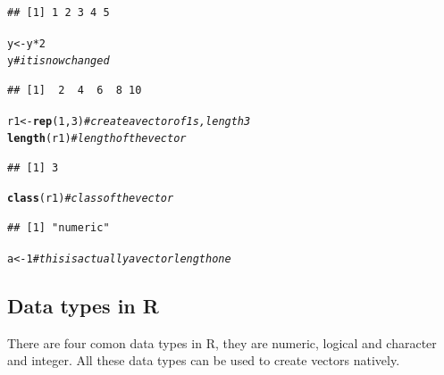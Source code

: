 \documentclass[english,nohyper]{tufte-book}\usepackage[]{graphicx}\usepackage[]{color}
\makeatletter
\newcommand{\hlnum}[1]{\textcolor[rgb]{0.686,0.059,0.569}{#1}}%
\newcommand{\hlcom}[1]{\textcolor[rgb]{0.678,0.584,0.686}{\textit{#1}}}%
\newcommand{\hlopt}[1]{\textcolor[rgb]{0,0,0}{#1}}%
\newcommand{\hlstd}[1]{\textcolor[rgb]{0.345,0.345,0.345}{#1}}%
\newcommand{\hlkwb}[1]{\textcolor[rgb]{0.69,0.353,0.396}{#1}}%
\newcommand{\hlkwd}[1]{\textcolor[rgb]{0.737,0.353,0.396}{\textbf{#1}}}%
\newenvironment{kframe}{%
 \def\at@end@of@kframe{}%
 \ifinner\ifhmode%
  \def\at@end@of@kframe{\end{minipage}}%
  \begin{minipage}{\columnwidth}%
 \fi\fi%
 \def\FrameCommand##1{\hskip\@totalleftmargin \hskip-\fboxsep
 \colorbox{shadecolor}{##1}\hskip-\fboxsep
     \hskip-\linewidth \hskip-\@totalleftmargin \hskip\columnwidth}%
 \MakeFramed {\advance\hsize-\width
   \@totalleftmargin\z@ \linewidth\hsize
   \@setminipage}}%
 {\par\unskip\endMakeFramed%
 \at@end@of@kframe}
\newenvironment{knitrout}{}{} %
\makeatother
\begin{document}
\begin{knitrout}
\begin{kframe}
\begin{verbatim}
## [1] 1 2 3 4 5
\end{verbatim}
\begin{alltt}
\hlstd{y} \hlkwb{<-} \hlstd{y} \hlopt{*} \hlnum{2}
\hlstd{y}  \hlcom{#it is now changed}
\end{alltt}
\begin{verbatim}
## [1]  2  4  6  8 10
\end{verbatim}
\begin{alltt}
\hlstd{r1} \hlkwb{<-} \hlkwd{rep}\hlstd{(}\hlnum{1}\hlstd{,} \hlnum{3}\hlstd{)}  \hlcom{# create a vector of 1s, length 3 }
\hlkwd{length}\hlstd{(r1)}  \hlcom{#length of the vector}
\end{alltt}
\begin{verbatim}
## [1] 3
\end{verbatim}
\begin{alltt}
\hlkwd{class}\hlstd{(r1)}  \hlcom{# class of the vector}
\end{alltt}
\begin{verbatim}
## [1] "numeric"
\end{verbatim}
\begin{alltt}
\hlstd{a} \hlkwb{<-} \hlnum{1}  \hlcom{# this is actually a vector length one}
\end{alltt}
\end{kframe}
\end{knitrout}



\subsection{Data types in R}

There are four comon data types in R, they are numeric, logical and
character and integer. All these data types can be used to create
vectors natively.
\end{document}
